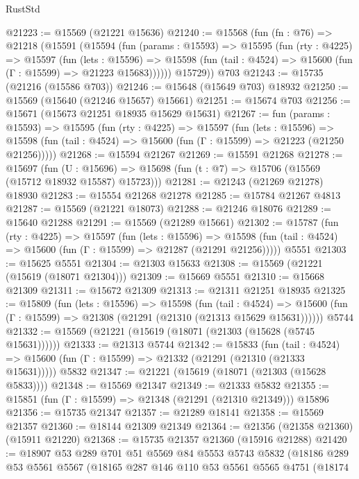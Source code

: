 \begin{lexlean}{RustStd}
\begin{coremodule}
@21223 := @15569 (@21221 @15636)
@21240 := @15568
    (fun (fn : @76) =>
    @21218
      (@15591
        (@15594
          (fun (params : @15593) =>
          @15595
            (fun (rty : @4225) =>
            @15597
              (fun (lets : @15596) =>
              @15598 (fun (tail : @4524) => @15600 (fun (Γ : @15599) => @21223 @15683))))))
        @15729))
    @703
@21243 := @15735 (@21216 (@15586 @703))
@21246 := @15648 (@15649 @703) @18932
@21250 := @15569 (@15640 (@21246 @15657) @15661)
@21251 := @15674 @703
@21256 := @15671 (@15673 @21251 @18935 @15629 @15631)
@21267 := fun (params : @15593) =>
  @15595
    (fun (rty : @4225) =>
    @15597
      (fun (lets : @15596) =>
      @15598 (fun (tail : @4524) => @15600 (fun (Γ : @15599) => @21223 (@21250 @21256)))))
@21268 := @15594 @21267
@21269 := @15591 @21268
@21278 := @15697
    (fun (U : @15696) => @15698 (fun (t : @7) => @15706 (@15569 (@15712 @18932 @15587) @15723)))
@21281 := @21243 (@21269 @21278) @18930
@21283 := @15554 @21268 @21278
@21285 := @15784 @21267 @4813
@21287 := @15569 (@21221 @18073)
@21288 := @21246 @18076
@21289 := @15640 @21288
@21291 := @15569 (@21289 @15661)
@21302 := @15787
    (fun (rty : @4225) =>
    @15597
      (fun (lets : @15596) =>
      @15598 (fun (tail : @4524) => @15600 (fun (Γ : @15599) => @21287 (@21291 @21256)))))
    @5551
@21303 := @15625 @5551
@21304 := @21303 @15633
@21308 := @15569 (@21221 (@15619 (@18071 @21304)))
@21309 := @15669 @5551
@21310 := @15668 @21309
@21311 := @15672 @21309
@21313 := @21311 @21251 @18935
@21325 := @15809
    (fun (lets : @15596) =>
    @15598
      (fun (tail : @4524) =>
      @15600 (fun (Γ : @15599) => @21308 (@21291 (@21310 (@21313 @15629 @15631))))))
    @5744
@21332 := @15569 (@21221 (@15619 (@18071 (@21303 (@15628 (@5745 @15631))))))
@21333 := @21313 @5744
@21342 := @15833
    (fun (tail : @4524) => @15600 (fun (Γ : @15599) => @21332 (@21291 (@21310 (@21333 @15631)))))
    @5832
@21347 := @21221 (@15619 (@18071 (@21303 (@15628 @5833))))
@21348 := @15569 @21347
@21349 := @21333 @5832
@21355 := @15851 (fun (Γ : @15599) => @21348 (@21291 (@21310 @21349))) @15896
@21356 := @15735 @21347
@21357 := @21289 @18141
@21358 := @15569 @21357
@21360 := @18144 @21309 @21349
@21364 := @21356 (@21358 @21360) (@15911 @21220)
@21368 := @15735 @21357 @21360 (@15916 @21288)
@21420 := @18907
    @53
    @289
    @701
    @51
    @5569
    @84
    @5553
    @5743
    @5832
    (@18186
      @289
      @53
      @5561
      @5567
      (@18165
        @287
        @146
        @110
        @53
        @5561
        @5565
        @4751
        (@18174

\end{coremodule}
\end{lexlean}
